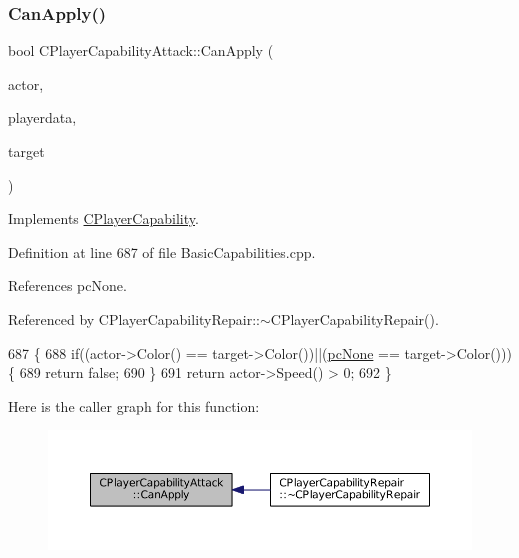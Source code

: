\subsubsection{\texorpdfstring{Can\+Apply()}{CanApply()}}
{\footnotesize\ttfamily bool C\+Player\+Capability\+Attack\+::\+Can\+Apply (\begin{DoxyParamCaption}\item[{std\+::shared\+\_\+ptr$<$ \hyperlink{classCPlayerAsset}{C\+Player\+Asset} $>$}]{actor,  }\item[{std\+::shared\+\_\+ptr$<$ \hyperlink{classCPlayerData}{C\+Player\+Data} $>$}]{playerdata,  }\item[{std\+::shared\+\_\+ptr$<$ \hyperlink{classCPlayerAsset}{C\+Player\+Asset} $>$}]{target }\end{DoxyParamCaption})\hspace{0.3cm}{\ttfamily [virtual]}}



Implements \hyperlink{classCPlayerCapability_ae96263e0950f496492f8baeb877b9554}{C\+Player\+Capability}.



Definition at line 687 of file Basic\+Capabilities.\+cpp.



References pc\+None.



Referenced by C\+Player\+Capability\+Repair\+::$\sim$\+C\+Player\+Capability\+Repair().


\begin{DoxyCode}
687                                                                                                            
                                                   \{
688     \textcolor{keywordflow}{if}((actor->Color() == target->Color())||(\hyperlink{GameDataTypes_8h_aafb0ca75933357ff28a6d7efbdd7602fa88767aa8e02c7b3192bbab4127b3d729}{pcNone} == target->Color()))\{
689         \textcolor{keywordflow}{return} \textcolor{keyword}{false};   
690     \}
691     \textcolor{keywordflow}{return} actor->Speed() > 0;
692 \}
\end{DoxyCode}
Here is the caller graph for this function\+:\nopagebreak
\begin{figure}[H]
\begin{center}
\leavevmode
\includegraphics[width=350pt]{classCPlayerCapabilityAttack_ab5cdd55fa3838304fd551426e41f7b17_icgraph}
\end{center}
\end{figure}
\hypertarget{classCPlayerCapabilityAttack_ab1cda67a8e637a90accf03d1581d4072}{}\label{classCPlayerCapabilityAttack_ab1cda67a8e637a90accf03d1581d4072} 

